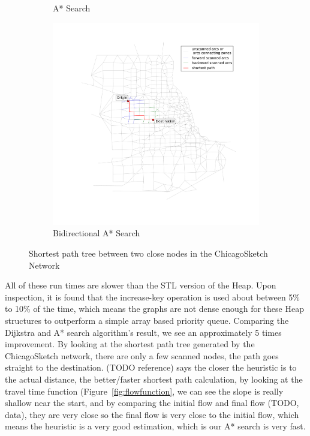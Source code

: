 \begin{figure}
\begin{subfigure}{.5\textwidth}
        \caption{A* Search}
        \label{fig:chicago_astar2}
    \end{subfigure}%
    \begin{subfigure}{.5\textwidth}
        \centering
        \includegraphics[width=\textwidth,trim=120px 120px 48px 0px,clip]{img/chicago_astar_bidirect2}
        \caption{Bidirectional A* Search}
        \label{fig:chicago_astar_bidirect2}
    \end{subfigure}
    \vspace{1em}
    \caption{Shortest path tree between two close nodes in the ChicagoSketch Network}
    \label{fig:short_sptree}
\end{figure}



All of these run times are slower than the STL version of the Heap.
Upon inspection,
it is found that the increase-key operation is used about between 5\% to 10\%
of the time,
which means the graphs are not dense enough for these Heap structures to outperform a
simple array based priority queue.
Comparing the Dijkstra and A* search algorithm's result,
we see an approximately 5 times improvement.
By looking at the shortest path tree generated
by the ChicagoSketch network,
there are only a few scanned nodes,
the path goes straight to the destination.
(TODO reference) says the closer the heuristic is to the actual distance,
the better/faster shortest path calculation,
by looking at the travel time function (Figure~\ref{fig:flowfunction}, we can see the slope
is really shallow near the start,
and by comparing the initial flow and final flow (TODO, data),
they are very close so the final flow is very close to the
initial flow,
which means the heuristic is a very good estimation,
which is our A* search is very fast.

